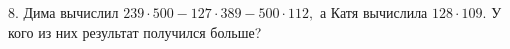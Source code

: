 8. Дима вычислил $239\cdot500-127\cdot389-500\cdot112,$ а Катя вычислила $128\cdot109.$ У кого из них результат получился больше?\\
